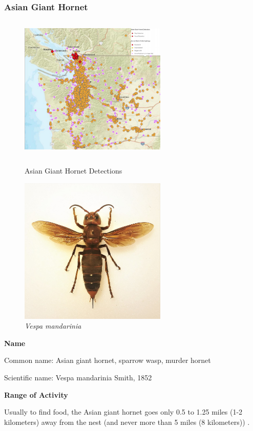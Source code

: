 \documentclass[12pt]{article}
\begin{document}
\subsubsection{Asian Giant Hornet  }
\begin{figure}[!htbp]
	\small
	\centering
	\begin{minipage}{8cm}
		\includegraphics[width=7cm,height=7cm]{./pictures/dist0.png}
		\caption{ Asian Giant Hornet Detections\cite{website}}\label{nt}
	\end{minipage}
	\begin{minipage}{8cm}
		\includegraphics[width=7cm,height=7cm]{./pictures/wikiintro.jpg}
		\caption{\emph{Vespa mandarinia}\cite{wiki}}\label{nt}
	\end{minipage}
	
\end{figure}

\textbf{Name}

Common name:  Asian giant hornet, sparrow wasp, murder hornet

Scientific name: Vespa mandarinia Smith, 1852

\textbf{Range of Activity }

Usually to find food, the Asian giant hornet goes only 0.5 to 1.25 miles (1-2 kilometers) away from the nest (and never more than 5 miles (8 kilometers)) .
\end{document}
